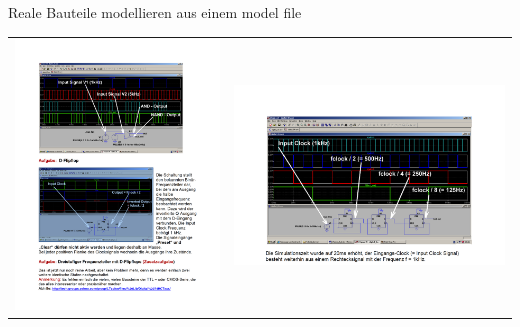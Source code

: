 \begin{frame}[t]{Reale Bauteile modellieren aus einem model file}

    \begin{spacing}{0.9} \begin{tiny}
            \begin{table}[h!]
                \begin{tabular}{p{5cm} p{5cm}}
                    \begin{minipage}{0.5\textwidth}
                        \includegraphics[width=\linewidth]{pictures/legacy/digi_3.png}
                    \end{minipage}
                     &
                    \begin{minipage}{0.5\textwidth}
                        \includegraphics[width=\linewidth]{pictures/legacy/digi_4.png}

\end{minipage}
\end{tabular}
\end{table}
\end{tiny}
\end{spacing}
\end{frame}
